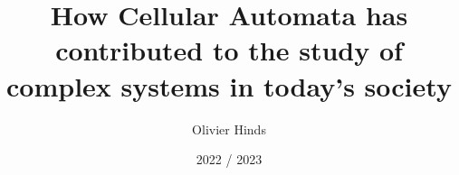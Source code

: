 \documentclass[twoside]{report}
\begin{document}
\pagestyle{fancy}
\title{How Cellular Automata has contributed to the study of complex systems in today’s society}
\author{Olivier Hinds}
\date{2022 / 2023}
\maketitle




\tableofcontents
\listoffigures











\lstlistoflistings


\clearpage



\printglossary
\printindex

\printnomenclature
\printbibliography
\appendix

\end{document}
